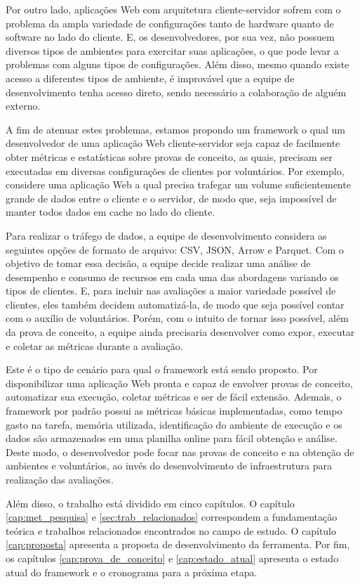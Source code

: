 \documentclass[12pt]{tcc}
\begin{document}
Por outro lado, aplicações Web com arquitetura cliente-servidor sofrem com o problema da ampla variedade de configurações tanto de hardware quanto de software no lado do cliente.
E, os desenvolvedores, por sua vez, não possuem diversos tipos de ambientes para exercitar suas aplicações, o que pode levar a problemas com alguns tipos de configurações.
Além disso, mesmo quando existe acesso a diferentes tipos de ambiente, é improvável que a equipe de desenvolvimento tenha acesso direto, sendo necessário a colaboração de alguém externo.

A fim de atenuar estes problemas, estamos propondo um framework o qual um desenvolvedor de uma aplicação Web cliente-servidor seja capaz de facilmente obter métricas e estatísticas sobre provas de conceito, as quais, precisam ser executadas em diversas configurações de clientes por voluntários.
Por exemplo, considere uma aplicação Web a qual precisa trafegar um volume suficientemente grande de dados entre o cliente e o servidor, de modo que, seja impossível de manter todos dados em cache no lado do cliente.

Para realizar o tráfego de dados, a equipe de desenvolvimento considera as seguintes opções de formato de arquivo: CSV, JSON, Arrow e Parquet.
Com o objetivo de tomar essa decisão, a equipe decide realizar uma análise de desempenho e consumo de recursos em cada uma das abordagens variando os tipos de clientes.
E, para incluir nas avaliações a maior variedade possível de clientes, eles também decidem automatizá-la, de modo que seja possível contar com o auxílio de voluntários.
Porém, com o intuito de tornar isso possível, além da prova de conceito, a equipe ainda precisaria desenvolver como expor, executar e coletar as métricas durante a avaliação.

Este é o tipo de cenário para qual o framework está sendo proposto.
Por disponibilizar uma aplicação Web pronta e capaz de envolver provas de conceito, automatizar sua execução, coletar métricas e ser de fácil extensão.
Ademais, o framework por padrão possui as métricas básicas implementadas, como tempo gasto na tarefa, memória utilizada, identificação do ambiente de execução e os dados são armazenados em uma planilha online para fácil obtenção e análise.
Deste modo, o desenvolvedor pode focar nas provas de conceito e na obtenção de ambientes e voluntários, ao invés do desenvolvimento de infraestrutura para realização das avaliações.

Além disso, o trabalho está dividido em cinco capítulos.
O capítulo \ref{cap:met_pesquisa} e \ref{sec:trab_relacionados} correspondem a fundamentação teórica e trabalhos relacionados encontrados no campo de estudo.
O capítulo \ref{cap:proposta} apresenta a proposta de desenvolvimento da ferramenta.
Por fim, os capítulos \ref{cap:prova_de_conceito} e \ref{cap:estado_atual} apresenta o estado atual do framework e o cronograma para a próxima etapa.
\end{document}
